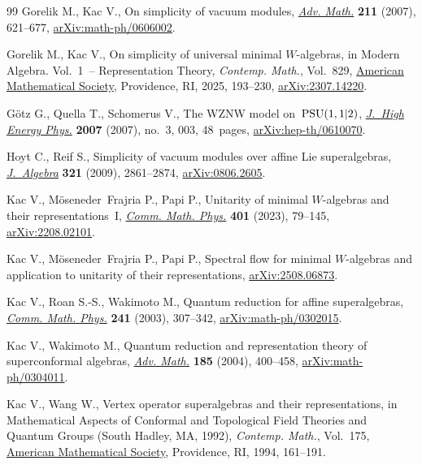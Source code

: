 \begin{thebibliography}{99}
Gorelik M., Kac V., On simplicity of vacuum modules,
 \href{https://doi.org/10.1016/j.aim.2006.09.004}{\textit{Adv. Math.}}
 \textbf{211} (2007), 621--677,
 \href{http://arxiv.org/abs/math-ph/0606002}{arXiv:math-ph/0606002}.

Gorelik M., Kac V., On simplicity of universal minimal {$W$}-algebras, in
 Modern {A}lgebra. {V}ol.~1~-- {R}epresentation {T}heory, \textit{Contemp.
 Math.}, Vol.~829, \href{https://doi.org/10.1090/conm/829/16549}{American
 Mathematical Society}, Providence, RI, 2025, 193--230,
 \href{http://arxiv.org/abs/2307.14220}{arXiv:2307.14220}.

G\"otz G., Quella T., Schomerus V., The {WZNW} model on~{${\rm PSU}(1,1|2)$},
 \href{https://doi.org/10.1088/1126-6708/2007/03/003}{\textit{J.~High Energy
 Phys.}} \textbf{2007} (2007), no.~3, 003, 48~pages,
 \href{http://arxiv.org/abs/hep-th/0610070}{arXiv:hep-th/0610070}.

Hoyt C., Reif S., Simplicity of vacuum modules over affine {L}ie superalgebras,
 \href{https://doi.org/10.1016/j.jalgebra.2009.02.003}{\textit{J.~Algebra}}
 \textbf{321} (2009), 2861--2874,
 \href{http://arxiv.org/abs/0806.2605}{arXiv:0806.2605}.

Kac V., M\"oseneder~Frajria P., Papi P., Unitarity of minimal {$W$}-algebras
 and their representations~{I},
 \href{https://doi.org/10.1007/s00220-023-04637-5}{\textit{Comm. Math. Phys.}}
 \textbf{401} (2023), 79--145,
 \href{http://arxiv.org/abs/2208.02101}{arXiv:2208.02101}.

Kac V., M\"oseneder~Frajria P., Papi P., Spectral flow for minimal
 {$W$}-algebras and application to unitarity of their representations,
 \href{http://arxiv.org/abs/2508.06873}{arXiv:2508.06873}.

Kac V., Roan S.-S., Wakimoto M., Quantum reduction for affine superalgebras,
 \href{https://doi.org/10.1007/s00220-003-0926-1}{\textit{Comm. Math. Phys.}}
 \textbf{241} (2003), 307--342,
 \href{http://arxiv.org/abs/math-ph/0302015}{arXiv:math-ph/0302015}.

Kac V., Wakimoto M., Quantum reduction and representation theory of
 superconformal algebras,
 \href{https://doi.org/10.1016/j.aim.2003.12.005}{\textit{Adv. Math.}}
 \textbf{185} (2004), 400--458,
 \href{http://arxiv.org/abs/math-ph/0304011}{arXiv:math-ph/0304011}.

Kac V., Wang W., Vertex operator superalgebras and their representations, in
 Mathematical {A}spects of {C}onformal and {T}opological {F}ield {T}heories
 and {Q}uantum {G}roups ({S}outh {H}adley, {MA}, 1992), \textit{Contemp.
 Math.}, Vol.~175, \href{https://doi.org/10.1090/conm/175/01843}{American
 Mathematical Society}, Providence, RI, 1994, 161--191.


\end{thebibliography}
